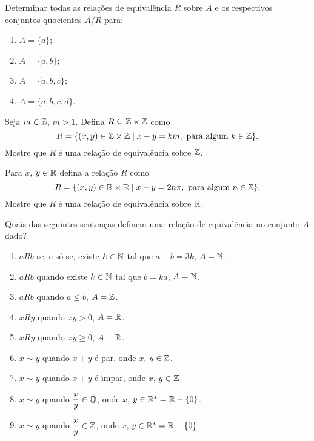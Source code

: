 \documentclass[12pt]{exam}
\begin{document}
    \vspace{.3cm}

    \questao{} Determinar todas as rela{\c c}{\~o}es de equival{\^e}ncia
    $R$ sobre $A$ e os respectivos conjuntos quocientes $A/R$ para:
    \begin{enumerate}[label={\alph*})]
        \item $A=\{a\}$;

        \item $A=\{a,b\}$;

        \item $A=\{a,b,c\}$;

        \item $A=\{a,b,c,d\}$.
    \end{enumerate}

    \vspace{.3cm}

    \questao{} Seja $m \in \mathbb{Z}$, $m > 1$. Defina $R \subseteq \mathbb{Z}\times\mathbb{Z}$ como
    \[
      R = \{(x,y) \in \mathbb{Z}\times\mathbb{Z} \mid x - y = km, \mbox{ para algum } k \in \mathbb{Z}\}.
    \]
    Mostre que $R$ \'e uma rela\c{c}\~ao de equival\^encia sobre $\mathbb{Z}$.

    \vspace{.3cm}

    \questao{} Para $x$, $y \in \mathbb{R}$ defina a relação $R$ como
    \[
        R = \{(x,y) \in \mathbb{R} \times \mathbb{R} \mid x - y = 2n\pi, \mbox{ para algum } n \in \mathbb{Z}\}.
    \]
    Mostre que $R$ é uma relação de equivalência sobre $\mathbb{R}$.

    \vspace{.3cm}

    \questao{} Quais das seguintes senten{\c c}as definem uma rela{\c c}{\~a}o de equival{\^e}ncia no conjunto $A$ dado?
    \begin{enumerate}[label={\alph*})]
        \item $aRb$ se, e s{\'o} se, existe $k \in \mathbb{N}$ tal que $a - b = 3k$, $A = \mathbb{N}$.

        \item $aRb$ quando existe $k \in \mathbb{N}$ tal que $b = k a$, $A = \mathbb{N}$.

        \item $aRb$ quando $a \le b$, $A = \mathbb{Z}$.

        \item $xRy$ quando $xy > 0$, $ A = \mathbb{R}$.

        \item $xRy$ quando $xy \ge 0$, $ A = \mathbb{R}$.

        \item $x \sim y$ quando $x + y$ \'e par, onde $x$, $y \in \mathbb{Z}$.

        \item $x \sim y$ quando $x + y$ \'e {\'\i}mpar, onde $x$, $y \in \mathbb{Z}$.

        \item $x \sim y$ quando $\dfrac{x}{y} \in \mathbb{Q}$, onde $x$, $y \in \mathbb{R}^* = \mathbb{R} - \{0\}$.

        \item $x \sim y$ quando $\dfrac{x}{y} \in \mathbb{Z}$, onde $x$, $y \in \mathbb{R}^* = \mathbb{R} - \{0\}$.
    \end{enumerate}
\end{document}
